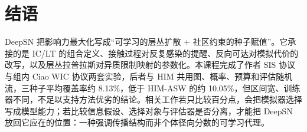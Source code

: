\documentclass[a4paper,11pt,twocolumn]{ctexart}
\begin{document}
\section{结语}

DeepSN 把影响力最大化写成“可学习的层丛扩散 $+$ 社区约束的种子赋值”。它承接的是 IC/LT 的组合定义\cite{kempe}、接触过程对反复感染的提醒\cite{pastor}、反向可达对模拟代价的改写\cite{borgs}，以及层丛拉普拉斯对异质限制映射的参数化\cite{hansen,bodnar}。本课程完成了作者 SIS 协议与组内 Ciao WIC 协议两套实验，后者与 HIM 共用图、概率、预算和评估随机流，三种子平均覆盖率约 8.13\%，低于 HIM-ASW 的约 10.05\%，但区间宽、训练器不同，不足以支持方法优劣的结论。相关工作若只比较百分点，会把模拟器选择写成模型能力；若比较信息假设、选择对象与评估器是否分离，才能把 DeepSN 放回它应在的位置：一种强调传播结构而非个体径向分数的可学习代理。
\end{document}

